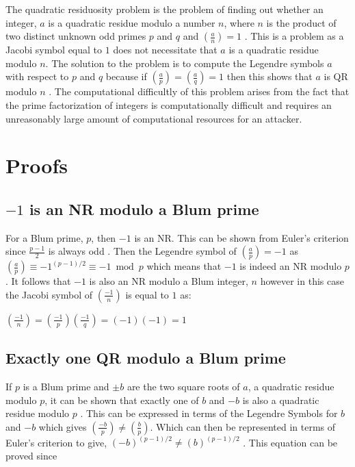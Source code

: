 \documentclass{article}
\begin{document}
The quadratic residuosity problem is the problem of finding out whether an integer, $a$ is a quadratic residue modulo a number $n$, where $n$ is the product of two distinct unknown odd primes $p$ and $q$ and $\left(\frac{a}{n}\right)=1$ \cite{Hittmeir2018}. This is a problem as a Jacobi symbol equal to $1$ does not necessitate that $a$ is a quadratic residue modulo $n$. The solution to the problem is to compute the Legendre symbols $a$ with respect to $p$ and $q$ because if $\left(\frac{a}{p}\right)=\left(\frac{a}{q}\right)=1$ then this shows that $a$ is QR modulo $n$ \cite{Hittmeir2018}. The computational difficultly of this problem arises from the fact that the prime factorization of integers is computationally difficult and requires an unreasonably large amount of computational resources for an attacker.

\section{Proofs}

\subsection{$-1$ is an NR modulo a Blum prime}

For a Blum prime, $p$, then $-1$ is an NR. This can be shown from Euler's criterion since $\frac{p-1}{2}$ is always odd \cite{Fischer2017}. Then the Legendre symbol of $\left(\frac{a}{p}\right)=-1$ as $\left(\frac{a}{p}\right) \equiv -1^{(p-1)/2} \equiv -1 \bmod p$ which means that $-1$ is indeed an NR modulo $p$ \cite{Fischer2017}. It follows that $-1$ is also an NR modulo a Blum integer, $n$ however in this case the Jacobi symbol of $\left(\frac{-1}{n}\right)$ is equal to $1$ as:

$\left(\frac{-1}{n}\right)=\left(\frac{-1}{p}\right) \left(\frac{-1}{q}\right)=(-1)(-1)=1$

\subsection{Exactly one QR modulo a Blum prime}

If $p$ is a Blum prime and $\pm b$ are the two square roots of $a$, a quadratic residue modulo $p$, it can be shown that exactly one of $b$ and $-b$ is also a quadratic residue modulo $p$ \cite{Fischer2017}. This can be expressed in terms of the Legendre Symbols for $b$ and $-b$ which gives $\left(\frac{-b}{p}\right) \not= \left(\frac{b}{p}\right)$. Which can then be represented in terms of Euler's criterion to give, $(-b)^{(p-1)/2} \not= (b)^{(p-1)/2}$ \cite{Fischer2017}. This equation can be proved since
\end{document}
